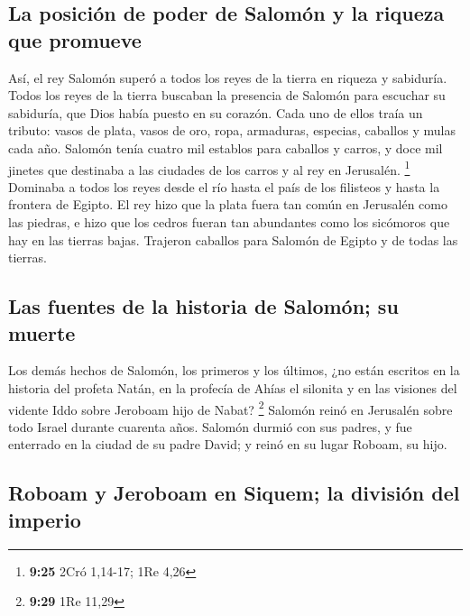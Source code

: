 \hypertarget{la-posiciuxf3n-de-poder-de-salomuxf3n-y-la-riqueza-que-promueve}{%
\subsection{La posición de poder de Salomón y la riqueza que
promueve}\label{la-posiciuxf3n-de-poder-de-salomuxf3n-y-la-riqueza-que-promueve}}

 Así, el rey Salomón superó a todos los reyes de la
tierra en riqueza y sabiduría.  Todos los reyes de la
tierra buscaban la presencia de Salomón para escuchar su sabiduría, que
Dios había puesto en su corazón.  Cada uno de ellos traía
un tributo: vasos de plata, vasos de oro, ropa, armaduras, especias,
caballos y mulas cada año.  Salomón tenía cuatro mil
establos para caballos y carros, y doce mil jinetes que destinaba a las
ciudades de los carros y al rey en Jerusalén. \footnote{\textbf{9:25}
  2Cró 1,14-17; 1Re 4,26}  Dominaba a todos los reyes
desde el río hasta el país de los filisteos y hasta la frontera de
Egipto.  El rey hizo que la plata fuera tan común en
Jerusalén como las piedras, e hizo que los cedros fueran tan abundantes
como los sicómoros que hay en las tierras bajas. 
Trajeron caballos para Salomón de Egipto y de todas las tierras.

\hypertarget{las-fuentes-de-la-historia-de-salomuxf3n-su-muerte}{%
\subsection{Las fuentes de la historia de Salomón; su
muerte}\label{las-fuentes-de-la-historia-de-salomuxf3n-su-muerte}}

 Los demás hechos de Salomón, los primeros y los últimos,
¿no están escritos en la historia del profeta Natán, en la profecía de
Ahías el silonita y en las visiones del vidente Iddo sobre Jeroboam hijo
de Nabat? \footnote{\textbf{9:29} 1Re 11,29}  Salomón
reinó en Jerusalén sobre todo Israel durante cuarenta años.
 Salomón durmió con sus padres, y fue enterrado en la
ciudad de su padre David; y reinó en su lugar Roboam, su hijo.

\hypertarget{roboam-y-jeroboam-en-siquem-la-divisiuxf3n-del-imperio}{%
\subsection{Roboam y Jeroboam en Siquem; la división del
imperio}\label{roboam-y-jeroboam-en-siquem-la-divisiuxf3n-del-imperio}}

